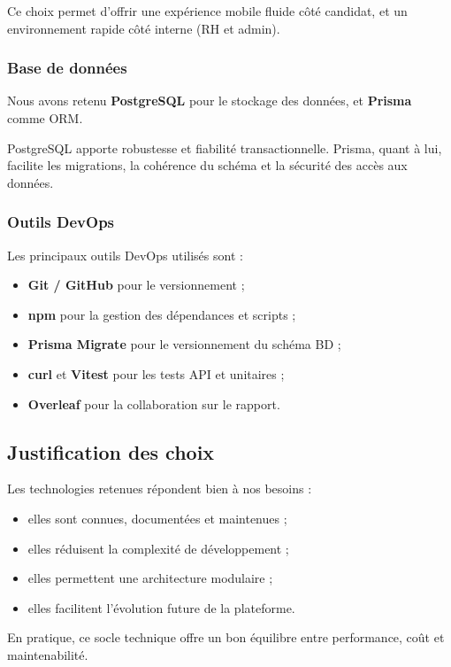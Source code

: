 Ce choix permet d'offrir une expérience mobile fluide côté candidat,
et un environnement rapide côté interne (RH et admin).

\subsubsection{Base de données}

Nous avons retenu \textbf{PostgreSQL} pour le stockage des données, et
\textbf{Prisma} comme ORM.

PostgreSQL apporte robustesse et fiabilité transactionnelle. Prisma,
quant à lui, facilite les migrations, la cohérence du schéma et la
sécurité des accès aux données.

\subsubsection{Outils DevOps}

Les principaux outils DevOps utilisés sont :
\begin{itemize}
    \item \textbf{Git / GitHub} pour le versionnement ;
    \item \textbf{npm} pour la gestion des dépendances et scripts ;
    \item \textbf{Prisma Migrate} pour le versionnement du schéma BD ;
    \item \textbf{curl} et \textbf{Vitest} pour les tests API et unitaires ;
    \item \textbf{Overleaf} pour la collaboration sur le rapport.
\end{itemize}

\subsection{Justification des choix}

Les technologies retenues répondent bien à nos besoins :
\begin{itemize}
    \item elles sont connues, documentées et maintenues ;
    \item elles réduisent la complexité de développement ;
    \item elles permettent une architecture modulaire ;
    \item elles facilitent l'évolution future de la plateforme.
\end{itemize}

En pratique, ce socle technique offre un bon équilibre entre performance,
coût et maintenabilité.


